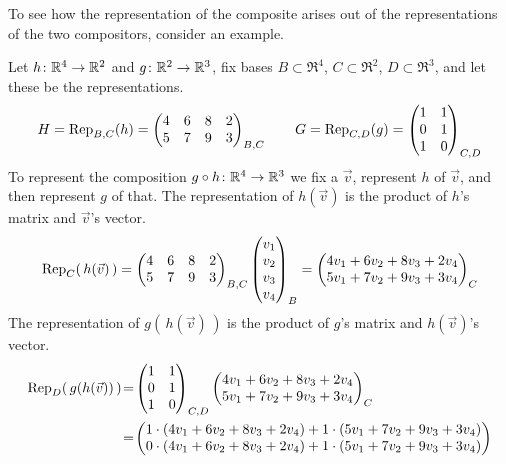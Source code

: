 To see how the representation of the 
composite arises out of the representations
of the two compositors, consider an example.

\begin{example} \label{ex:RepCompLinMaps}
Let $\map{h}{\Re^4}{\Re^2}$ and $\map{g}{\Re^2}{\Re^3}$,
fix bases
\( B\subset\Re^4 \), \( C\subset\Re^2 \), \( D\subset\Re^3 \), 
and let these be the representations.
\begin{equation*}
  H=\rep{h}{B,C}
  =\begin{pmatrix}
       4  &6  &8  &2  \\
       5  &7  &9  &3
    \end{pmatrix}_{B,C}
  \qquad
  G=\rep{g}{C,D}
  =\begin{pmatrix}
       1  &1  \\
       0  &1  \\
       1  &0
    \end{pmatrix}_{C,D}
\end{equation*}
To 
represent the composition \( \map{\composed{g}{h}}{\Re^4}{\Re^3} \)
we fix a $\vec{v}$, represent $h$ of $\vec{v}$, 
and then represent $g$ of that.
The representation of $h(\vec{v})$ is the product of $h$'s matrix and 
$\vec{v}$'s vector.
\begin{equation*}
  \rep{\,h(\vec{v})\,}{C}
  =
  \begin{pmatrix}
    4  &6  &8  &2  \\
    5  &7  &9  &3
  \end{pmatrix}_{B,C}
  \colvec{v_1 \\ v_2 \\ v_3 \\ v_4}_B  
  =
  \colvec{4v_1+6v_2+8v_3+2v_4 \\ 5v_1+7v_2+9v_3+3v_4}_C
\end{equation*}
The representation of $g(\,h(\vec{v})\,)$ is the product of $g$'s matrix
and $h(\vec{v})$'s vector.
\begin{align*}
  \rep{\,g(h(\vec{v}))\,}{D}\!
  &=\!\begin{pmatrix}
      1  &1  \\
      0  &1  \\
      1  &0
   \end{pmatrix}_{C,D}
   \colvec{4v_1+6v_2+8v_3+2v_4 \\ 5v_1+7v_2+9v_3+3v_4}_C    \\
  &=\!\colvec{1\cdot(4v_1+6v_2+8v_3+2v_4)+1\cdot(5v_1+7v_2+9v_3+3v_4) \\ 
               0\cdot(4v_1+6v_2+8v_3+2v_4)+1\cdot(5v_1+7v_2+9v_3+3v_4) \\
}
\end{align*}
\end{example}
